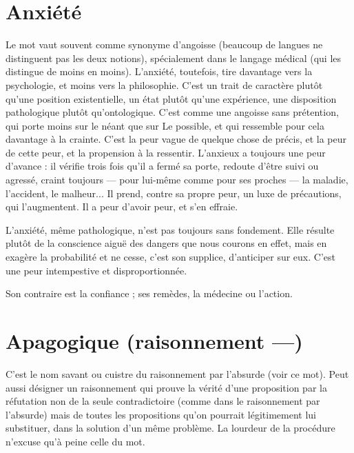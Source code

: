 \section{Anxiété}
Le mot vaut souvent comme synonyme d’angoisse (beaucoup de
langues ne distinguent pas les deux notions), spécialement dans
le langage médical (qui les distingue de moins en moins). L’anxiété, toutefois,
tire davantage vers la psychologie, et moins vers la philosophie. C’est un trait
de caractère plutôt qu’une position existentielle, un état plutôt qu’une expérience,
une disposition pathologique plutôt qu’ontologique. C’est comme une
angoisse sans prétention, qui porte moins sur le néant que sur Le possible, et
qui ressemble pour cela davantage à la crainte. C’est la peur vague de quelque
chose de précis, et la peur de cette peur, et la propension à la ressentir.
L’anxieux a toujours une peur d’avance : il vérifie trois fois qu’il a fermé sa
porte, redoute d’être suivi ou agressé, craint toujours — pour lui-même
comme pour ses proches — la maladie, l’accident, le malheur... Il prend,
contre sa propre peur, un luxe de précautions, qui l’augmentent. Il a peur
d’avoir peur, et s’en effraie.

L’anxiété, même pathologique, n’est pas toujours sans fondement. Elle
résulte plutôt de la conscience aiguë des dangers que nous courons en effet,
mais en exagère la probabilité et ne cesse, c’est son supplice, d’anticiper sur eux.
C’est une peur intempestive et disproportionnée.

Son contraire est la confiance ; ses remèdes, la médecine ou l’action.

\section{Apagogique (raisonnement —)}
C’est le nom savant ou cuistre du
raisonnement par l’absurde (voir ce
mot). Peut aussi désigner un raisonnement qui prouve la vérité d’une proposition
par la réfutation non de la seule contradictoire (comme dans le raisonnement
par l’absurde) mais de toutes les propositions qu’on pourrait légitimement
lui substituer, dans la solution d’un même problème. La lourdeur de la
procédure n’excuse qu’à peine celle du mot.

